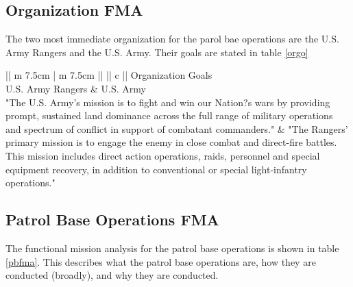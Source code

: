 \documentclass[../../main/main.tex]{subfiles}
\begin{document}
\subsection{Organization FMA}
The two most immediate organization for the parol bae operations are the U.S. Army Rangers and the U.S. Army.  Their goals are stated in table \ref{orgo}
\begin{table}[h!]
\parskip=8pt
\begin{tabular}{||  m {7.5cm}  |  m {7.5cm}  ||}
\hline
{} {|| c ||} {Organization Goals} \\
 \hline
U.S. Army Rangers	& U.S. Army\\
\hline
"The U.S. Army's mission is to fight and win our Nation?s wars by providing prompt, sustained land dominance across the full range of military operations and spectrum of conflict in support of combatant commanders."
&	
"The Rangers' primary mission is to engage the enemy in close combat and direct-fire battles. This mission includes direct action operations, raids, personnel and special equipment recovery, in addition to conventional or special light-infantry operations."\\
\hline
\end{tabular}
\caption{Organization goals.}
\label{orgo}
\end{table}
\clearpage

\subsection{Patrol Base Operations FMA}
The functional mission analysis for the patrol base operations is shown in table \ref{pbfma}.  This describes what the patrol base operations are, how they are conducted (broadly), and why they are conducted.
\end{document}
